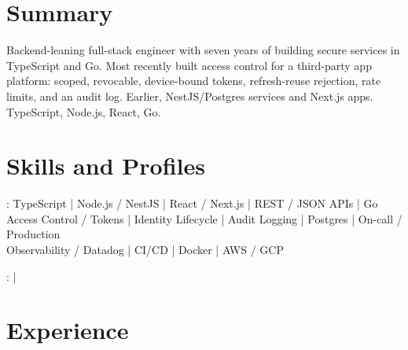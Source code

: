 \documentclass[print]{jack-resume}
\begin{document}
\pagecolor{darkmodeBackground}


\begin{minipage}[t][1cm][t]{.03\textwidth}
    \hfill
\end{minipage}

\section{Summary}
Backend-leaning full-stack engineer with seven years of building secure services in TypeScript and Go. Most recently built access control for a third-party app platform: scoped, revocable, device-bound tokens, refresh-reuse rejection, rate limits, and an audit log. Earlier, NestJS/Postgres services and Next.js apps. TypeScript, Node.js, React, Go.
\sectionsep

\section{Skills and Profiles}
:
TypeScript \hfill | \hfill
Node.js / NestJS \hfill | \hfill
React / Next.js \hfill | \hfill
REST / JSON APIs \hfill | \hfill
Go \\
\hspace{1.0cm} Access Control / Tokens \hfill | \hfill
Identity Lifecycle \hfill | \hfill
Audit Logging \hfill | \hfill
Postgres \hfill | \hfill
On-call / Production \\
\hspace{1.0cm} Observability / Datadog \hfill | \hfill
CI/CD \hfill | \hfill
Docker \hfill | \hfill
AWS / GCP \\

\raggedright{
    :
      \href{https://www.linkedin.com/in/jack-sturtevant/}{ \ExternalLink} |
     \href{https://github.com/jacksturt}{ \ExternalLink}}

\section{Experience}
\end{document}

